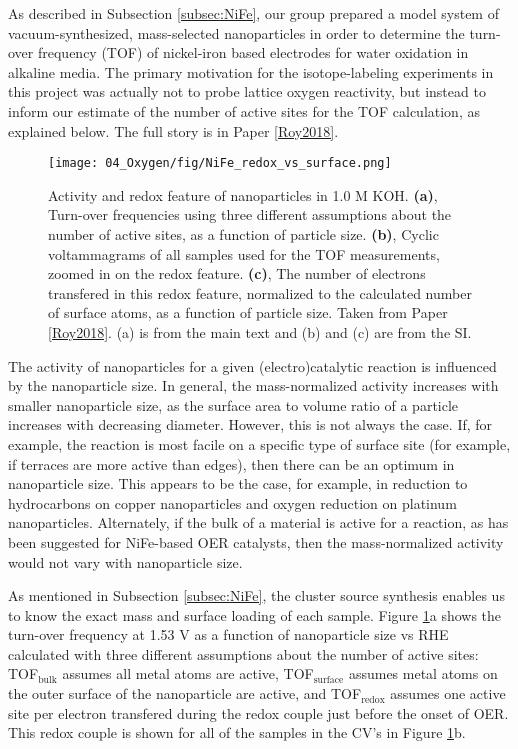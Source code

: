 As described in Subsection \ref{subsec:NiFe}, our group prepared a model system of vacuum-synthesized, mass-selected  nanoparticles in order to determine the turn-over frequency (TOF) of nickel-iron based electrodes for water oxidation in alkaline media. The primary motivation for the isotope-labeling experiments in this project was actually not to probe lattice oxygen reactivity, but instead to inform our estimate of the number of active sites for the TOF calculation, as explained below. The full story is in Paper \ref{Roy2018}. 

\begin{figure}[h!]
	\centering
	\texttt{[image: 04\_Oxygen/fig/NiFe\_redox\_vs\_surface.png]}
	\caption{Activity and redox feature of  nanoparticles in 1.0 M KOH. \textbf{(a)}, Turn-over frequencies using three different assumptions about the number of active sites, as a function of particle size. \textbf{(b)}, Cyclic voltammagrams of all samples used for the TOF measurements, zoomed in on the redox feature. \textbf{(c)}, The number of electrons transfered in this redox feature, normalized to the calculated number of surface atoms, as a function of particle size. Taken from Paper \ref{Roy2018}. (a) is from the main text and (b) and (c) are from the SI.}
	\label{fig:redox_vs_surf}
\end{figure}

The activity of nanoparticles for a given (electro)catalytic reaction is influenced by the nanoparticle size\cite{Mistry2016b}. In general, the mass-normalized activity increases with smaller nanoparticle size, as the surface area to volume ratio of a particle increases with decreasing diameter. However, this is not always the case. If, for example, the reaction is most facile on a specific type of surface site (for example, if terraces are more active than edges), then there can be an optimum in nanoparticle size. This appears to be the case, for example, in  reduction to hydrocarbons on copper nanoparticles\cite{Reske2014} and oxygen reduction on platinum nanoparticles\cite{Hernandez-Fernandez2014}. Alternately, if the bulk of a material is active for a reaction, as has been suggested for NiFe-based OER catalysts\cite{Batchellor2015, Doyle2017}, then the mass-normalized activity would not vary with nanoparticle size.

As mentioned in Subsection \ref{subsec:NiFe}, the cluster source synthesis enables us to know the exact mass and surface loading of each sample. Figure \ref{fig:redox_vs_surf}a shows the turn-over frequency at 1.53 V as a function of nanoparticle size vs RHE calculated with three different assumptions about the number of active sites: TOF$_{\text{bulk}}$ assumes all metal atoms are active, TOF$_{\text{surface}}$ assumes metal atoms on the outer surface of the nanoparticle are active, and TOF$_{\text{redox}}$ assumes one active site per electron transfered during the  redox couple just before the onset of OER. This redox couple is shown for all of the samples in the CV's in Figure \ref{fig:redox_vs_surf}b.


